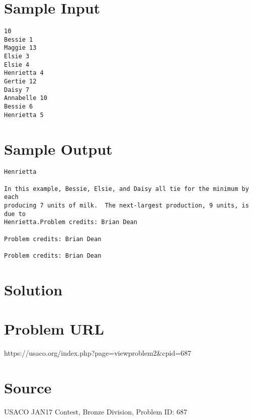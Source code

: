 \documentclass[12pt]{article}
\begin{document}
\section*{Sample Input}
\begin{verbatim}
10
Bessie 1
Maggie 13
Elsie 3
Elsie 4
Henrietta 4
Gertie 12
Daisy 7
Annabelle 10
Bessie 6
Henrietta 5
\end{verbatim}

\section*{Sample Output}
\begin{verbatim}
Henrietta

In this example, Bessie, Elsie, and Daisy all tie for the minimum by each
producing 7 units of milk.  The next-largest production, 9 units, is due to
Henrietta.Problem credits: Brian Dean

Problem credits: Brian Dean

Problem credits: Brian Dean
\end{verbatim}

\section*{Solution}


\section*{Problem URL}
https://usaco.org/index.php?page=viewproblem2&cpid=687

\section*{Source}
USACO JAN17 Contest, Bronze Division, Problem ID: 687
\end{document}
